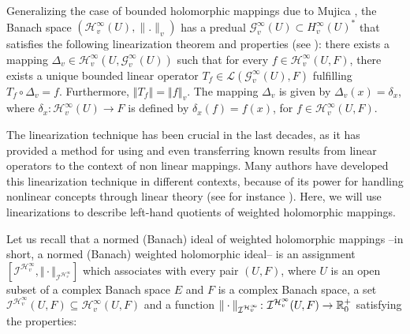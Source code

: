 \documentclass[12pt]{amsart}
\theoremstyle{plain}
\numberwithin{equation}{section}
\begin{document}
Generalizing the case of bounded holomorphic mappings due to Mujica \cite{Mu}, the Banach space $(\mathcal{H}
_{v}^{\infty }(U), \|.\|_v)$ has a predual $\mathcal{G}_{v}^{\infty
}(U)\subset H_v^\infty (U)^*$ that satisfies the following linearization theorem  and properties (see \cite{BaDe3,Ru}): there exists a mapping $\Delta _{v}\in \mathcal{H}_{v}^{\infty
}(U,\mathcal{G}_{v}^{\infty }(U))$ such that for every $f\in \mathcal{H}%
_{v}^{\infty }(U,F)$, there exists a unique bounded linear  operator $T_{f}\in \mathcal{L}(%
\mathcal{G}_{v}^{\infty }(U),F)$ fulfilling $T_{f}\circ \Delta _{v}=f$.
Furthermore, $\left\Vert T_{f}\right\Vert =\left\Vert f\right\Vert _{v}$.
The mapping $\Delta _{v}$ is given by $\Delta _{v}(x)=\delta _{x}$, where  $\delta _{x}\colon \mathcal{H}_{v}^{\infty }(U)\rightarrow F$ is defined by $\delta _{x}(f)=f(x)$, for $f\in \mathcal{H}_{v}^{\infty }(U,F)$.

The linearization technique has been crucial in the last decades, as it has provided a method for using and even transferring known results from linear operators to the context of non linear mappings. Many authors have developed this linearization technique in different contexts, because of its power for handling nonlinear concepts through linear theory (see for instance \cite{BoPeRu,BeBuRu, BuBu, PeRuSa}). Here, we will use linearizations to describe left-hand quotients of weighted holomorphic mappings.



Let us recall
that a normed (Banach) ideal of weighted holomorphic mappings --in short, a normed (Banach) weighted holomorphic ideal-- is an assignment $\left[ \mathcal{I}^{\mathcal{H}_{v}^{\infty }},\Vert \cdot \Vert _{\mathcal{I}^{\mathcal{H}_{v}^{\infty }}}%
\right] $ which associates with every pair $(U,F)$, where $U$ is an open
subset of a complex Banach space $E$ and $F$ is a complex Banach space, a
set $\mathcal{I}^{\mathcal{H}_{v}^{\infty }}(U,F)\subseteq \mathcal{H}%
_{v}^{\infty }(U,F)$ and a function $\Vert \cdot \Vert _{\mathcal{I}^{%
\mathcal{H}_{v}^{\infty }}}\colon \mathcal{I}^{\mathcal{H}_{v}^{\infty
}}(U,F)\rightarrow \mathbb{R}_{0}^{+}$ satisfying the properties:
\end{document}
